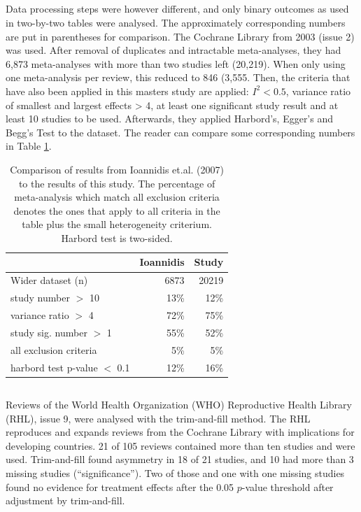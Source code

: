 \documentclass[11pt,a4paper,twoside]{book}\usepackage[]{graphicx}\usepackage[]{color}
\begin{document}
\subsection{\citet{Ioannidis2007}}
Data processing steps were however different, and only binary outcomes as used in two-by-two tables were analysed. The approximately corresponding numbers are put in parentheses for comparison. The Cochrane Library from 2003 (issue 2) was used. After removal of duplicates and intractable meta-analyses, they had 6,873 meta-analyses with more than two studies left (20,219). When only using one meta-analysis per review, this reduced to 846 (3,555. Then, the criteria that have also been applied in this masters study are applied: $I^2 < 0.5$, variance ratio of smallest and largest effects > 4, at least one significant study result and at least 10 studies to be used. Afterwards, they applied Harbord's, Egger's and Begg's Test to the dataset. The reader can compare some corresponding numbers in Table \ref{ioannidis}.

\begin{table}[ht]
\centering
\begin{tabular}{lrr}
  \hline
 & Ioannidis & Study \\ 
  \hline
Wider dataset (n) & 6873 & 20219 \\ 
  study number $>$ 10 & 13\% & 12\% \\ 
  variance ratio $>$ 4 & 72\% & 75\% \\ 
  study sig. number $>$ 1 & 55\% & 52\% \\ 
  all exclusion criteria & 5\% & 5\% \\ 
  harbord test p-value $<$ 0.1 & 12\% & 16\% \\ 
   \hline
\end{tabular}
\caption{Comparison of results from Ioannidis et.al. (2007) to the results of this study. The percentage of meta-analysis which match all exclusion criteria denotes the ones that apply to all criteria in the table plus the small heterogeneity criterium. Harbord test is two-sided.} 
\label{ioannidis}
\end{table}


\subsection{\citet{souza.2007}}
Reviews of the World Health Organization (WHO) Reproductive Health Library (RHL), issue 9, were analysed with the trim-and-fill method. The RHL reproduces and expands reviews from the Cochrane Library with implications for developing countries. 21 of 105 reviews contained more than ten studies and were used. Trim-and-fill found asymmetry in 18 of 21 studies, and 10 had more than 3 missing studies (``significance''). Two of those and one with one missing studies found no evidence for treatment effects after the 0.05 $p$-value threshold after adjustment by trim-and-fill.
\end{document}

